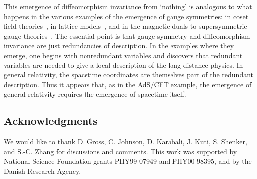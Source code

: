 \documentclass[a4paper,12pt]{article}
\begin{document}
This emergence of diffeomorphism invariance
from `nothing' is analogous to what happens in the various examples of the
emergence of gauge symmetries: in coset field theories~\cite{coset}, in lattice
models~\cite{lattice}, and in the magnetic duals to supersymmetric gauge
theories~\cite{duals}.  The essential point is that gauge symmetry and
diffeomorphism invariance are just redundancies of description.  In the
examples where they emerge, one begins with nonredundant variables and
discovers that redundant variables are needed to give a local description of
the long-distance physics.  In general relativity, the spacetime
coordinates are themselves part of the redundant description.  Thus it appears
that, as in the AdS/CFT example, the emergence of general relativity requires
the emergence of spacetime itself.



\subsection*{Acknowledgments}

We would like to thank D. Gross, C. Johnson, D. Karabali, J. Kuti, S. Shenker,
and S.-C. Zhang for discussions and comments.  This work was supported by
National Science Foundation grants PHY99-07949 and PHY00-98395, and by the
Danish Research Agency.
\end{document}
